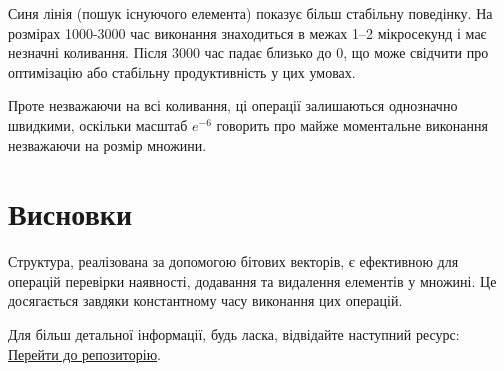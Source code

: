 \documentclass[a4paper,12pt]{article}
\begin{document}
Синя лінія (пошук існуючого елемента) показує більш стабільну поведінку. На розмірах 1000-3000 час виконання знаходиться в межах 1–2 мікросекунд і має незначні коливання. Після 3000 час падає близько до 0, що може свідчити про оптимізацію або стабільну продуктивність у цих умовах.

Проте незважаючи на всі коливання, ці операції залишаються однозначно швидкими, оскільки масштаб \( e^{-6} \) говорить про майже моментальне виконання незважаючи на розмір множини.

\section{Висновки}
Структура, реалізована за допомогою бітових векторів, є ефективною для операцій перевірки наявності, додавання та видалення елементів у множині. Це досягається завдяки константному часу виконання цих операцій.

Для більш детальної інформації, будь ласка, відвідайте наступний ресурс:
\href{https://github.com/gre1wy/AppliedAlgorithms/tree/main/lab1}{Перейти до репозиторію}.
\end{document}
